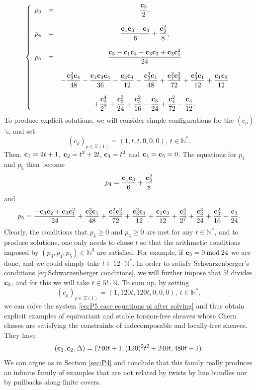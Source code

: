 \documentclass[a4paper,10pt]{amsart}
\theoremstyle{plain}{
    \newtheorem{theorem}{Theorem}[section]
    \newtheorem{lemma}[theorem]{Lemma}
    \newtheorem{corollary}[theorem]{Corollary}
    \newtheorem{proposition}[theorem]{Proposition}
    \newtheorem{conjecture}[theorem]{Conjecture}
}
\theoremstyle{definition}{
    \newtheorem{definition}[theorem]{Definition}
    \newtheorem{defn-thm}[theorem]{Definition-Theorem}
    \newtheorem{example}[theorem]{Example}
    \newtheorem{notation}[theorem]{Notation}
}
\theoremstyle{remark}{
    \newtheorem{remark}[theorem]{Remark}
    \newtheorem{problem}[theorem]{Problem}
    \newtheorem{question}[theorem]{Question}
}
\def\uc{{\bf c}}
\def\N{\mathbb{N}}
\begin{document}
\begin{equation}
 \label{eq:P5 case equations pi after solving}
\left\{
\begin{array}{ccc}
p_3 & = & \displaystyle\frac{\uc_3}{2}, \\
& & \\
p_4 & = & \displaystyle\frac{\uc_1\uc_3-\uc_4}{6}+\frac{\uc_3^2}{8},\\
& & \\
p_5 & = & \displaystyle\frac{\uc_5-\uc_1\uc_4-\uc_3\uc_2+\uc_3\uc_1^2}{24}\\
& & \\
& & \displaystyle-\frac{\uc_3^2\uc_4}{48}-\frac{\uc_1\uc_3\uc_4}{36}-\frac{\uc_3\uc_4}{12}\displaystyle+\frac{\uc_3^3\uc_1}{48}+\frac{\uc_1^2\uc_3^2}{72}+\frac{\uc_3^2\uc_1}{12}+\frac{\uc_1\uc_3}{12}\\
& & \\
    &  &  \displaystyle+\frac{\uc_3^4}{2^7}+\frac{\uc_3^3}{24}+\frac{\uc_3^2}{16}-\frac{\uc_3}{24} \displaystyle +\frac{\uc_4^2}{72}-\frac{\uc_4}{12}.
\end{array}
\right.
\end{equation}
To produce explicit solutions, we will consider simple configurations for the $(c_\rho)$'s, and set 
$$
(c_\rho)_{\rho\in\Sigma(1)}=(1,t,t,0,0,0),\: t\in\N^*.
$$
Then, $\uc_1=2t+1$, $\uc_2=t^2+2t$, $\uc_3=t^2$ and $\uc_4=\uc_5=0$. The equations for $p_4$ and $p_5$ then become 
$$
p_4=\displaystyle\frac{\uc_1\uc_3}{6}+\frac{\uc_3^2}{8}
$$
and 
$$
p_5=\frac{-\uc_3\uc_2+\uc_3\uc_1^2}{24}+\frac{\uc_3^3\uc_1}{48}+\frac{\uc_1^2\uc_3^2}{72}+\frac{\uc_3^2\uc_1}{12}+\frac{\uc_1\uc_3}{12}+\frac{\uc_3^4}{2^7}+\frac{\uc_3^3}{24}+\frac{\uc_3^2}{16}-\frac{\uc_3}{24}.
$$
Clearly, the conditions that $p_4\geq 0$ and $p_5\geq 0$ are met for any $t\in\N^*$, and to produce solutions, one only needs to chose $t$ so that the arithmetic conditions imposed by $(p_3,p_4,p_5)\in\N^3$ are satisfied. For example, if $\uc_3=0\: \mathrm{ mod }\: 24$ we are done, and we could simply take $t\in 12\cdot\N^*$. In order to satisfy Schwarzenberger's conditions \eqref{eq:Schwarzenberger conditions}, we will further impose that $5!$ divides $\uc_2$, and for this we will take $t\in 5!\cdot \N$. To sum up, by setting 
$$
(c_\rho)_{\rho\in\Sigma(1)}=(1,120t,120t,0,0,0),\: t\in\N^*,
$$
we can solve the system \eqref{eq:P5 case equations pi after solving} and thus obtain explicit examples of equivariant and stable torsion-free sheaves whose Chern classes are satisfying the constraints of indecomposable and locally-free sheaves. They have
$$
(\uc_1,\uc_2,\Delta)=(240t+1,(120)^2t^2+240t,480t-1).
$$
We can argue as in Section \ref{sec:P4} and conclude that this family really produces an infinite family of examples that are not related by twists by line bundles nor by pullbacks along finite covers.
\end{document}
